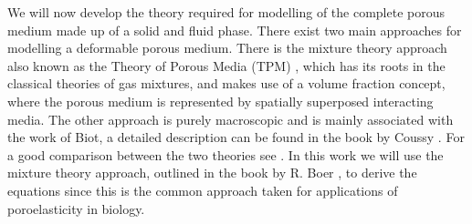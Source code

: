 We will now develop the theory required for modelling of the complete porous medium
made up of a solid and fluid phase. There exist two main approaches for modelling a deformable
porous medium. There is the mixture theory approach also known as the Theory of Porous Media (TPM)
\citep{bowenporouslectures,bowen1980incompressible,boer2005trends}, which has its roots in the classical theories of gas mixtures, and makes use
of a volume fraction concept, where the porous medium is represented by spatially superposed interacting media. The other approach is purely
macroscopic and is mainly associated with the work of Biot, a detailed description can be found
in the book by Coussy \citet{coussy2004poromechanics}. For a good comparison between the two theories see \citet{coussy1998mixture}. In this work we will use
the mixture theory approach, outlined in the book by R. Boer \citet{boer2005trends}, to derive the equations since this is the common approach taken
for applications of poroelasticity in biology.

